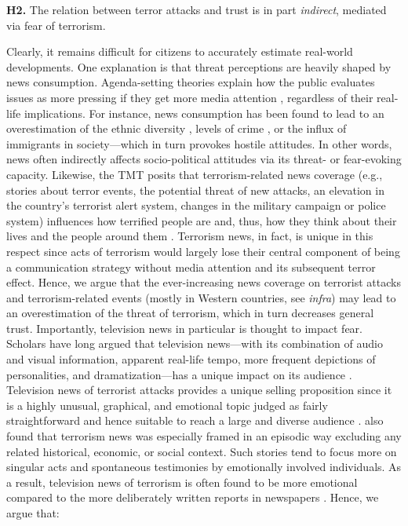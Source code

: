 \vspace{5mm}
\noindent\textbf{H2.} The relation between terror attacks and trust is in part \textit{indirect}, mediated via fear of
terrorism.
\vspace{5mm}


Clearly, it remains difficult for citizens to accurately estimate real-world developments. One explanation is that threat perceptions are heavily shaped by news consumption. Agenda-setting theories explain how the public evaluates issues as more pressing if they get more media attention \citep{Iyengar1987}, regardless of their real-life implications. For instance, news consumption has been found to lead to an overestimation of the ethnic diversity \citep{Jacobs2017, VanKlingeren2015}, levels of crime \citep{Romer2003}, or the influx of immigrants \citep{Dunaway2010} in society---which in turn provokes hostile attitudes. In other words, news often indirectly affects socio-political attitudes via its threat- or fear-evoking capacity. Likewise, the TMT posits that terrorism-related news coverage (e.g., stories about terror events, the potential threat of new attacks, an elevation in the country’s terrorist alert system, changes in the military campaign or police system) influences how terrified people are and, thus, how they think about their lives and the people around them \citep{Pyszczynski2003}. Terrorism news, in fact, is unique in this respect since acts of terrorism would largely lose their central component of being a communication strategy without media attention and its subsequent terror effect. Hence, we argue that the ever-increasing news coverage on terrorist attacks and terrorism-related events (mostly in Western countries, see \textit{infra}) may lead to an overestimation of the threat of terrorism, which in turn decreases general trust. Importantly, television news in particular is thought to impact fear. Scholars have long argued that television news---with its combination of audio and visual information, apparent real-life tempo, more frequent depictions of personalities, and dramatization---has a unique impact on its audience \citep{Gadarian2010c}. Television news of terrorist attacks provides a unique selling proposition since it is a highly unusual, graphical, and emotional topic judged as fairly straightforward and hence suitable to reach a large and diverse audience \citep{Spencer2017}. \cite{Iyengar1991} also found that terrorism news was especially framed in an episodic way excluding any related historical, economic, or social context. Such stories tend to focus more on singular acts and spontaneous testimonies by emotionally involved individuals. As a result, television news of terrorism is often found to be more emotional compared to the more deliberately written reports in newspapers \citep{Cho2003}. Hence, we argue that:

